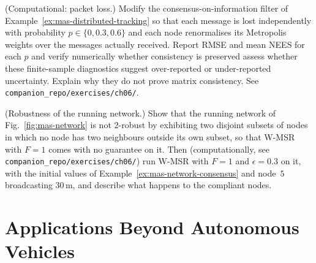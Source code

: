 \documentclass[graybox,envcountchap]{style/SNmono}
\newcommand{\repopath}[1]{\texttt{#1}}
\providecommand{\DIFadd}[1]{{\protect\color{blue} #1}} %
\providecommand{\DIFdel}[1]{{\protect\color{red} #1}} %
\providecommand{\DIFaddbegin}{} %
\providecommand{\DIFaddend}{} %
\providecommand{\DIFdelbegin}{} %
\providecommand{\DIFdelend}{} %
\begin{document}
\begin{prob}\label{prob:ch06:6}
(Computational: packet loss.) Modify the consensus-on-information filter of Example~\ref{ex:mas-distributed-tracking} so that each message is lost independently with probability $p\in\{0,0.3,0.6\}$ and each node renormalises its Metropolis weights over the messages actually received. Report RMSE and mean NEES for each $p$ and \DIFdelbegin \DIFdel{verify numerically whether consistency is preserved}\DIFdelend \DIFaddbegin \DIFadd{assess whether these finite-sample diagnostics suggest over-reported or under-reported uncertainty. Explain why they do not prove matrix consistency}\DIFaddend . See \repopath{companion\_\allowbreak repo/\allowbreak exercises/\allowbreak ch06/\allowbreak }.
\end{prob}

\begin{prob}\label{prob:ch06:7}
(Robustness of the running network.) Show that the running network of Fig.~\ref{fig:mas-network} is not $2$-robust by exhibiting two disjoint subsets of nodes in which no node has two neighbours outside its own subset, so that W-MSR with $F=1$ comes with no guarantee on it. Then (computationally, see \repopath{companion\_\allowbreak repo/\allowbreak exercises/\allowbreak ch06/\allowbreak }) run W-MSR with $F=1$ and $\epsilon=0.3$ on it, with the initial values of Example~\ref{ex:mas-network-consensus} and node~$5$ broadcasting $30$\,m, and describe what happens to the compliant nodes.
\end{prob}




\clearpage

\clearpage

\chapter{Applications Beyond Autonomous Vehicles}
\label{sec:applications}
\end{document}
